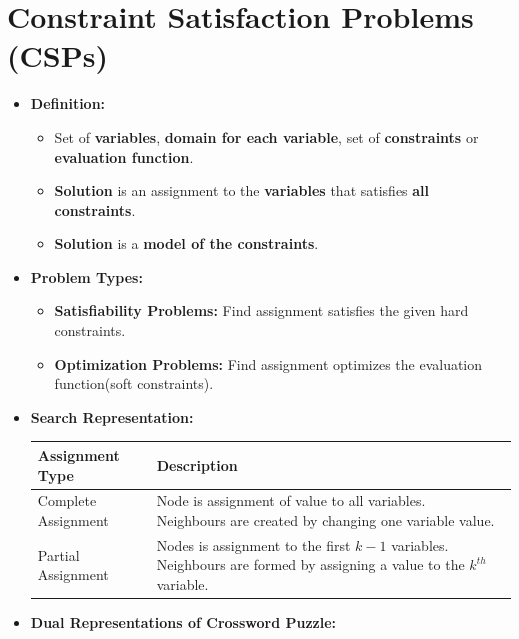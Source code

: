 \documentclass{article}
\theoremstyle{note}
\begin{document}

\section{Constraint Satisfaction Problems (CSPs)}

\begin{itemize}
  \item \textbf{Definition:}
  \begin{itemize}
    \item Set of \textbf{variables},  \textbf{domain for each variable}, set of \textbf{constraints} or \textbf{evaluation function}.
    \item \textbf{Solution} is an assignment to the \textbf{variables} that satisfies \textbf{all constraints}.
    \item \textbf{Solution} is a \textbf{model of the constraints}.
  \end{itemize}

  \item \textbf{Problem Types:}
  \begin{itemize}
    \item \textbf{Satisfiability Problems:} Find assignment satisfies the given hard constraints.
    \item \textbf{Optimization Problems:} Find assignment optimizes the evaluation function(soft constraints).
  \end{itemize}

  \item \textbf{Search Representation:}
  
	\begin{tabular}{@{}ll@{}}
	\toprule
 	\textbf{Assignment Type} & \textbf{Description} \\ \midrule
	Complete Assignment & \makecell[l]{Node is  assignment of value to all variables. \\Neighbours are created by changing one variable value.} \\ \midrule
	Partial Assignment & \makecell[l]{Nodes is assignment to the first \(k-1\) variables. \\Neighbours are formed by assigning a value to the \(k^{th}\) variable.} \\
	\bottomrule
	\end{tabular}


  \item \textbf{Dual Representations of Crossword Puzzle:}
  

\end{itemize}
\end{document}
